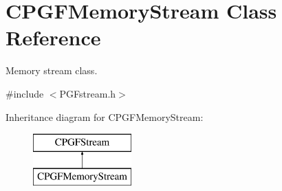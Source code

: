 \hypertarget{classCPGFMemoryStream}{}\section{C\+P\+G\+F\+Memory\+Stream Class Reference}
\label{classCPGFMemoryStream}


Memory stream class.  




{\ttfamily \#include $<$P\+G\+Fstream.\+h$>$}

Inheritance diagram for C\+P\+G\+F\+Memory\+Stream\+:\begin{figure}[H]
\begin{center}
\leavevmode
\includegraphics[height=2.000000cm]{classCPGFMemoryStream}
\end{center}
\end{figure}
